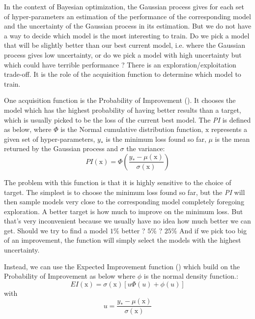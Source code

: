 In the context of Bayesian optimization, the Gaussian process gives for each set of hyper-parameters an estimation of the performance of the corresponding model and the uncertainty of the Gaussian process in its estimation. But we do not have a way to decide which model is the most interesting to train. Do we pick a model that will be slightly better than our best current model, i.e. where the Gaussian process gives low uncertainty, or do we pick a model with high uncertainty but which could have terrible performance ? There is an exploration/exploitation trade-off. It is the role of the acquisition function to determine which model to train.

One acquisition function is the Probability of Improvement (\textcite{kushner1964}). It chooses the model which has the highest probability of having better results than a target, which is usually picked to be the loss of the current best model. The \textit{PI} is defined as below, where $\Phi$ is the Normal cumulative distribution function, $\mathrm{x}$ represents a given set of hyper-parameters, $y_*$ is the minimum loss found so far, $\mu$ is the mean returned by the Gaussian process and $\sigma$ the variance:
\begin{equation}
    PI(\mathrm{x}) = \Phi \left( \frac{y_* - \mu(\mathrm{x})}{\sigma(\mathrm{x})}\right)
\end{equation}

The problem with this function is that it is highly sensitive to the choice of target. The simplest is to choose the minimum loss found so far, but the \textit{PI} will then sample models very close to the corresponding model completely foregoing exploration. A better target is how much to improve on the minimum loss. But that's very inconvenient because we usually have no idea how much better we can get. Should we try to find a model $1 \%$ better ? $5 \%$ ? $25 \%$ And if we pick too big of an improvement, the function will simply select the models with the highest uncertainty.

Instead, we can use the Expected Improvement function (\textcite{schonlau1998}) which build on the Probability of Improvement as below where $\phi$ is the normal density function.:
\begin{equation}
	EI(\mathrm{x})  = \sigma (\mathrm{x}) [u\Phi(u)+\phi(u)]
\end{equation}
with
\begin{equation}
	u = \frac{y_* - \mu(\mathrm{x})}{\sigma(\mathrm{x})}
\end{equation}

